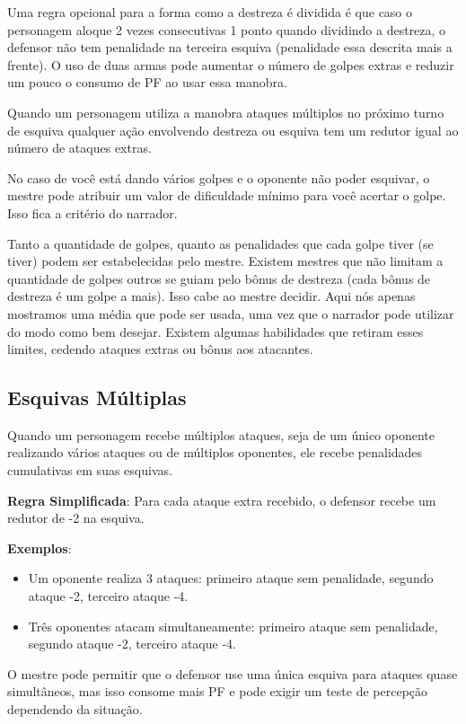 Uma regra opcional para a forma como a destreza é dividida é que caso o personagem aloque 2 vezes consecutivas 1 ponto quando dividindo a destreza, o defensor não tem penalidade na terceira esquiva (penalidade essa descrita mais a frente). O uso de duas armas pode aumentar o número de golpes extras e reduzir um pouco o consumo de PF ao usar essa manobra. 

Quando um personagem utiliza a manobra ataques múltiplos no próximo turno de esquiva qualquer ação envolvendo destreza ou esquiva tem um redutor igual ao número de ataques extras.
	
No caso de você está dando vários golpes e o oponente não poder esquivar, o mestre pode atribuir um valor de dificuldade mínimo para você acertar o golpe. Isso fica a critério do narrador.
	
Tanto a quantidade de golpes, quanto as penalidades que cada golpe tiver (se tiver) podem ser estabelecidas pelo mestre. Existem mestres que não limitam a quantidade de golpes outros se guiam pelo bônus de destreza (cada bônus de destreza é um golpe a mais). Isso cabe ao mestre decidir. Aqui nós apenas mostramos uma média que pode ser usada, uma vez que o narrador pode utilizar do modo como bem desejar. Existem algumas habilidades que retiram esses limites, cedendo ataques extras ou bônus aos atacantes. 

\subsection{Esquivas Múltiplas}

Quando um personagem recebe múltiplos ataques, seja de um único oponente realizando vários ataques ou de múltiplos oponentes, ele recebe penalidades cumulativas em suas esquivas.

\textbf{Regra Simplificada}: Para cada ataque extra recebido, o defensor recebe um redutor de -2 na esquiva.

\textbf{Exemplos}:
\begin{itemize}
	\item Um oponente realiza 3 ataques: primeiro ataque sem penalidade, segundo ataque -2, terceiro ataque -4.
	\item Três oponentes atacam simultaneamente: primeiro ataque sem penalidade, segundo ataque -2, terceiro ataque -4.
\end{itemize}

O mestre pode permitir que o defensor use uma única esquiva para ataques quase simultâneos, mas isso consome mais PF e pode exigir um teste de percepção dependendo da situação.
 


